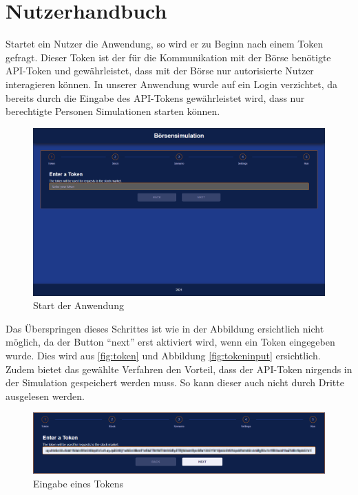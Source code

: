 \chapter{Nutzerhandbuch}\label{cha:Nutzerhandbuch}

Startet ein Nutzer die Anwendung, so wird er zu Beginn nach einem Token gefragt. Dieser Token ist der für die Kommunikation mit der Börse benötigte API-Token und gewährleistet, dass mit der Börse nur autorisierte Nutzer interagieren können. In unserer Anwendung wurde auf ein Login verzichtet, da bereits durch die Eingabe des API-Tokens gewährleistet wird, dass nur berechtigte Personen Simulationen starten können. 
\begin{figure}[ht]
	\includegraphics[width=\textwidth]{img/Token.png}
	\centering
	\caption{Start der Anwendung}
	\label{fig:token}
\end{figure}

Das Überspringen dieses Schrittes ist wie in der Abbildung ersichtlich nicht möglich, da der Button \enquote{next} erst aktiviert wird, wenn ein Token eingegeben wurde. Dies wird aus \autoref{fig:token} und Abbildung \autoref{fig:tokeninput} ersichtlich. Zudem bietet das gewählte Verfahren den Vorteil, dass der API-Token nirgends in der Simulation gespeichert werden muss. So kann dieser auch nicht durch Dritte ausgelesen werden.
\begin{figure}[ht]
	\includegraphics[width=\textwidth]{img/TokenInput.png}
	\centering
	\caption{Eingabe eines Tokens}
	\label{fig:tokeninput}
\end{figure}


